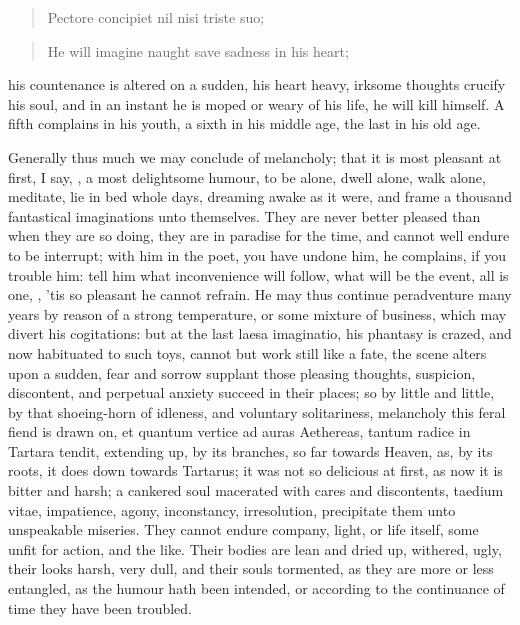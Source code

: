 {\begin{latin}
\begin{verse}%
Pectore concipiet nil nisi triste suo;
\end{verse}%
\end{latin}
\translationrule
\begin{verse}%
He will imagine naught save sadness in his heart;
\end{verse}%

his countenance is altered on a sudden, his heart heavy, irksome
thoughts crucify his soul, and in an instant he is moped or weary of
his life, he will kill himself. A fifth complains in his youth, a sixth
in his middle age, the last in his old age.

Generally thus much we may conclude of melancholy; that it is
most pleasant at first, I say, , a
most delightsome humour, to be alone, dwell alone, walk alone,
meditate, lie in bed whole days, dreaming awake as it were, and frame a
thousand fantastical imaginations unto themselves. They are never
better pleased than when they are so doing, they are in paradise for
the time, and cannot well endure to be interrupt; with him in the poet,
 you have undone him,
he complains, if you trouble him: tell him what inconvenience will
follow, what will be the event, all is one, ,
'tis so pleasant he cannot refrain. He may thus continue
peradventure many years by reason of a strong temperature, or some
mixture of business, which may divert his cogitations: but at the last
laesa imaginatio, his phantasy is crazed, and now habituated to such
toys, cannot but work still like a fate, the scene alters upon a
sudden, fear and sorrow supplant those pleasing thoughts, suspicion,
discontent, and perpetual anxiety succeed in their places; so by little
and little, by that shoeing-horn of idleness, and voluntary
solitariness, melancholy this feral fiend is drawn on, et quantum
vertice ad auras Aethereas, tantum radice in Tartara tendit, extending
up, by its branches, so far towards Heaven, as, by its roots, it does
down towards Tartarus; it was not so delicious at first, as now it is
bitter and harsh; a cankered soul macerated with cares and discontents,
taedium vitae, impatience, agony, inconstancy, irresolution,
precipitate them unto unspeakable miseries. They cannot endure company,
light, or life itself, some unfit for action, and the like. Their
bodies are lean and dried up, withered, ugly, their looks harsh, very
dull, and their souls tormented, as they are more or less entangled, as
the humour hath been intended, or according to the continuance of time
they have been troubled.

}
